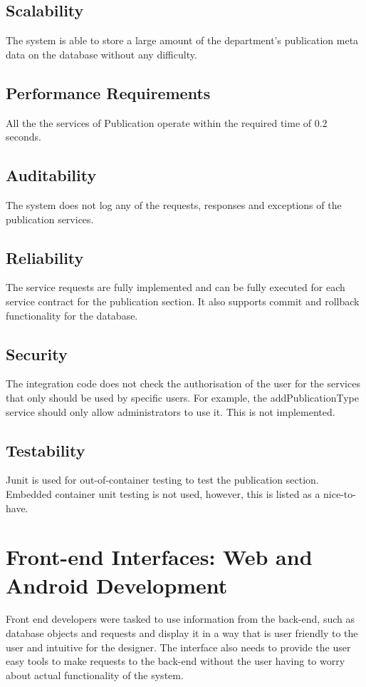 \documentclass{article}
\begin{document}
    \subsection{Scalability}
    The system is able to store a large amount of the department's publication meta data on the database without any difficulty.
    
    \subsection{Performance Requirements}
    All the the services of Publication operate within the required time of 0.2 seconds.
    
    \subsection{Auditability}
    The system does not log any of the requests, responses and exceptions of the publication services.
    
    
    \subsection{Reliability}
    The service requests are fully implemented and can be fully executed for each service contract for the publication section. It also supports commit and rollback functionality for the database.
    
    \subsection{Security}
    The integration code does not check the authorisation of the user for the services that only should be used by specific users. For example, the addPublicationType service should only allow administrators to use it. This is not implemented.
    
    \subsection{Testability}
    Junit is used for out-of-container testing to test the publication section. Embedded container unit testing is not used, however, this is listed as a nice-to-have.

\newpage
\section{Front-end Interfaces: Web and Android Development}
        Front end developers were tasked to use information from the back-end, such as database objects and requests and display it in a way that is user friendly to the user and intuitive for the designer. The interface also needs to provide the user easy tools to make requests to the back-end without the user having to worry about actual functionality of the system.
\end{document}
